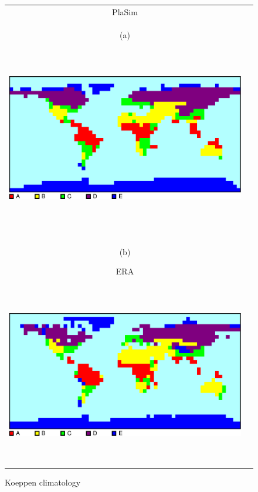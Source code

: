 \documentclass[12pt,a4paper,twoside,openright,headinclude,liststotoc,bibtotoc]{scrreprt}
\begin{document}
\begin{figure}[b]
\begin{tabular}{cc}
\hspace{-0.5cm}PlaSim \vspace{-0.2cm}
\\
\begin{minipage}{1.0\textwidth}\hspace{1.01cm}\begin{scriptsize}(a)\end{scriptsize} \vspace{-0.05cm}
\begin{center}
\includegraphics[height=8.0cm]{eps/koep_ctrl.eps}
\end{center}
\end{minipage}
\\
\\
\\
\begin{minipage}{1.0\textwidth}\begin{scriptsize}\hspace{1.01cm}(b)\end{scriptsize}\hspace{6.5cm}ERA\vspace{-0.05cm}
\begin{center}
\includegraphics[height=8.0cm]{eps/koep_era.eps}
\end{center}
\end{minipage}
\end{tabular}
\caption[Koeppen climatology]{Koeppen climatology}
\label{img:koeppen}
\end{figure}
\end{document}
